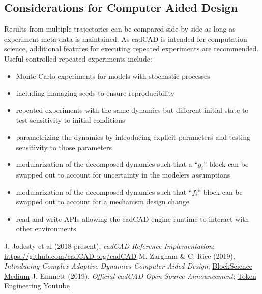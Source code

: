 \documentclass[]{article}
\begin{document}
\hypertarget{considerations}{%
\subsection{Considerations for Computer Aided Design}\label{considerations}}

Results from multiple trajectories can be compared side-by-side as long
as experiment meta-data is maintained. As cadCAD is intended for
computation science, additional features for executing repeated
experiments are recommended. Useful controlled repeated experiments
include:

\begin{itemize}
\item Monte Carlo experiments for models with stochastic processes
\item including managing seeds to ensure reproducibility
\item repeated experiments with the same dynamics but different initial state to test sensitivity to initial conditions
\item parametrizing the dynamics by introducing explicit parameters and testing sensitivity to those
parameters
\item modularization of the decomposed dynamics such that a ``\(g_i\)'' block can be swapped out to account for uncertainty in the modelers assumptions
\item modularization of the decomposed dynamics such that ``\(f_i\)'' block can be swapped out to account for a mechanism design change
\item read and write APIs allowing the cadCAD engine runtime to interact with other environments
\end{itemize}

\begin{thebibliography}{widest entry}
  J. Jodesty et al (2018-present), \textit{cadCAD Reference Implementation}; \underline{\href{https://github.com/cadCAD-org/cadCAD}{https://github.com/cadCAD-org/cadCAD}}
  M. Zargham \& C. Rice (2019), \textit{Introducing Complex Adaptive Dynamics Computer Aided Design}; \underline{\href{https://medium.com/block-science/introducing-complex-adaptive-dynamics-computer-aided-design-cadcad-38b63b541eb8}{BlockScience Medium}}
  J. Emmett (2019), \textit{Official cadCAD Open Source Announcement}; \underline{\href{https://www.youtube.com/watch?v=tFcSqKXfCuE&t=30589s}{Token Engineering Youtube}}
\end{thebibliography}
\end{document}

